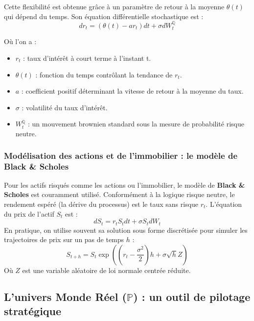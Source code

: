 Cette flexibilité est obtenue grâce à un paramètre de retour à la moyenne $\theta(t)$ qui dépend du temps. Son équation différentielle stochastique est :
\begin{equation}
    dr_t = (\theta(t) - ar_t)dt + \sigma dW^{\mathbb{Q}}_t
\end{equation}

Où l'on a :
\begin{itemize}
    \item $r_t$ : taux d’intérêt à court terme à l’instant t.
    \item $\theta(t)$ : fonction du temps contrôlant la tendance de $r_t$.
    \item $a$ : coefficient positif déterminant la vitesse de retour à la moyenne du taux.
    \item $\sigma$ : volatilité du taux d’intérêt.
    \item $W^{\mathbb{Q}}_t$ : un mouvement brownien standard sous la mesure de probabilité risque neutre.
\end{itemize}

\subsubsection{Modélisation des actions et de l'immobilier : le modèle de Black \& Scholes}
Pour les actifs risqués comme les actions ou l'immobilier, le modèle de \textbf{Black \& Scholes} est couramment utilisé. Conformément à la logique risque neutre, le rendement espéré (la dérive du processus) est le taux sans risque $r_t$. L'équation du prix de l'actif $S_t$ est :
\begin{equation}
    dS_t = r_t S_t dt + \sigma S_t dW_t
\end{equation}
En pratique, on utilise souvent sa solution sous forme discrétisée pour simuler les trajectoires de prix sur un pas de temps $h$ :
\begin{equation}
    S_{t+h} = S_t \exp\left( \left(r_t - \frac{\sigma^2}{2}\right)h + \sigma\sqrt{h}Z \right)
\end{equation}
Où $Z$ est une variable aléatoire de loi normale centrée réduite.

\subsection{L'univers Monde Réel ($\mathbb{P}$) : un outil de pilotage stratégique}

